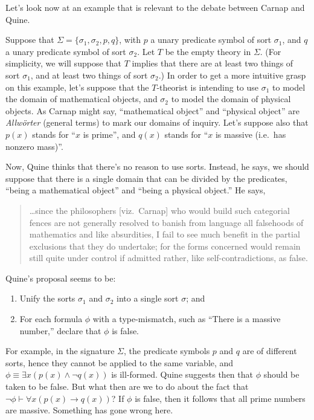 \begin{example} \label{qboom} Let's look now at an example that is
relevant to the debate between Carnap and Quine.

Suppose that $\Sigma = \{\sigma _1,\sigma _2,p,q\}$, with $p$ a
unary predicate symbol of sort $\sigma _1$, and $q$ a unary
predicate symbol of sort $\sigma _2$.  Let $T$ be the empty theory
  in $\Sigma$.  (For simplicity, we will suppose that $T$ implies that
  there are at least two things of sort $\sigma _1$, and at least two
  things of sort $\sigma _2$.)  In order to get a more intuitive grasp
  on this example, let's suppose that the $T$-theorist is intending to
  use $\sigma _1$ to model the domain of mathematical objects, and
  $\sigma _2$ to model the domain of physical objects.  As Carnap
  might say, ``mathematical object'' and ``physical object'' are {\it
    Allw\"orter} (general terms) to mark our domains of inquiry.
Let's suppose also that $p(x)$ stands for ``$x$ is prime'', and
$q(x)$ stands for ``$x$ is massive (i.e.\ has nonzero mass)''.

Now, Quine thinks that there's no reason to use sorts.  Instead, he
  says, we should suppose that there is a single domain that can be
  divided by the predicates, ``being a mathematical object'' and
  ``being a physical object.''  He says,
  \begin{quote}
    \dots since the philosophers [viz.\ Carnap] who would build such
    categorial fences are not generally resolved to banish from
    language all falsehoods of mathematics and like absurdities, I
    fail to see much benefit in the partial exclusions that they do
    undertake; for the forms concerned would remain still quite under
    control if admitted rather, like self-contradictions, as false.
    \cite[p. 229]{quine1960} \end{quote} Quine's proposal seems to be:
  \begin{enumerate}
  \item Unify the sorts $\sigma _1$ and $\sigma _2$ into a single sort
    $\sigma$; and
  \item For each formula $\phi$ with a type-mismatch, such as ``There
    is a massive number,'' declare that $\phi$ is
    false.  \end{enumerate} For example, in the signature $\Sigma$,
  the predicate symbols $p$ and $q$ are of different sorts, hence they
  cannot be applied to the same variable, and
  $\phi\equiv \exists x(p(x)\wedge \neg q(x))$ is ill-formed.  Quine
  suggests then that $\phi$ should be taken to be false.  But what
  then are we to do about the fact that
  $\neg \phi\vdash \forall x(p(x)\to q(x))$?  If $\phi$ is false, then
  it follows that all prime numbers are massive.  Something has gone
  wrong here.


\end{example}
